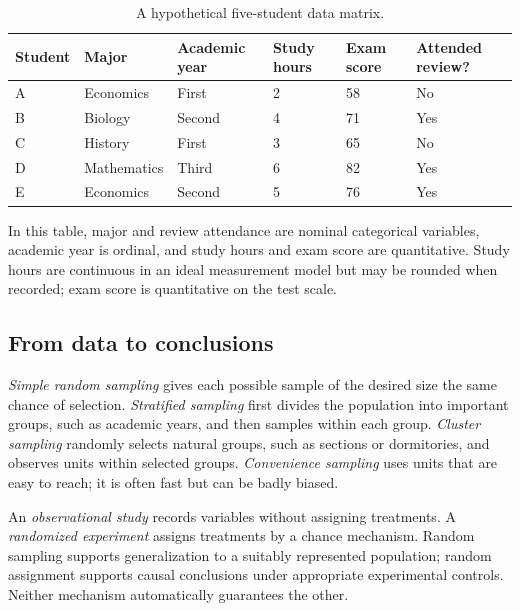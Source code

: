 \documentclass[11pt]{article}
\begin{document}
\begin{table}[ht]
\centering
\caption{A hypothetical five-student data matrix.}\label{tab:data-matrix}
\begin{tabularx}{\textwidth}{@{}lYYYYY@{}}
\toprule
Student & Major & Academic year & Study hours & Exam score & Attended review? \\
\midrule
A & Economics & First & 2 & 58 & No \\
B & Biology & Second & 4 & 71 & Yes \\
C & History & First & 3 & 65 & No \\
D & Mathematics & Third & 6 & 82 & Yes \\
E & Economics & Second & 5 & 76 & Yes \\
\bottomrule
\end{tabularx}
\end{table}

In this table, major and review attendance are nominal categorical variables,
academic year is ordinal, and study hours and exam score are quantitative.
Study hours are continuous in an ideal measurement model but may be rounded
when recorded; exam score is quantitative on the test scale.

\subsection{From data to conclusions}
\emph{Simple random sampling} gives each possible sample of the desired size
the same chance of selection.  \emph{Stratified sampling} first divides the
population into important groups, such as academic years, and then samples
within each group.  \emph{Cluster sampling} randomly selects natural groups,
such as sections or dormitories, and observes units within selected groups.
\emph{Convenience sampling} uses units that are easy to reach; it is often
fast but can be badly biased.

An \emph{observational study} records variables without assigning treatments.
A \emph{randomized experiment} assigns treatments by a chance mechanism.
Random sampling supports generalization to a suitably represented population;
random assignment supports causal conclusions under appropriate experimental
controls.  Neither mechanism automatically guarantees the other.
\end{document}
